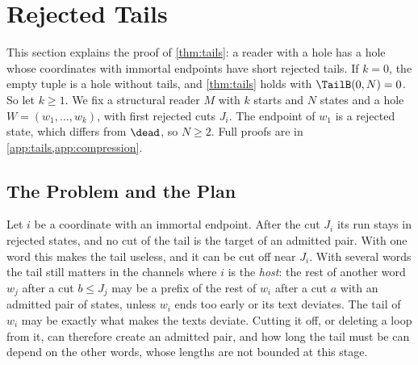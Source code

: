 \section{Rejected Tails}
\label{sec:tails}

This section explains the proof of \cref{thm:tails}: a reader with a hole
has a hole whose coordinates with immortal endpoints have short rejected
tails. If $k=0$, the empty tuple is a hole without tails, and
\cref{thm:tails} holds with $\TailB(0,N)=0$. So let $k\ge1$. We fix a
structural reader $M$ with $k$ starts and $N$ states and a hole
$W=(w_1,\dots,w_k)$, with first rejected cuts $J_i$. The endpoint of $w_1$
is a rejected state, which differs from $\dead$, so $N\ge2$. Full proofs are
in \cref{app:tails,app:compression}.

\subsection{The Problem and the Plan}\label{sec:tails-plan}

Let $i$ be a coordinate with an immortal endpoint. After the cut $J_i$ its
run stays in rejected states, and no cut of the tail is the target of an
admitted pair. With one word this makes the tail useless, and it can be cut
off near $J_i$. With several words the tail still matters in the channels
where $i$ is the \emph{host}: the rest of another word $w_j$ after a cut
$b\le J_j$ may be a prefix of the rest of $w_i$ after a cut $a$ with an
admitted pair of states, unless $w_i$ ends too early or its text deviates.
The tail of $w_i$ may be exactly what makes the texts deviate. Cutting it
off, or deleting a loop from it, can therefore create an admitted pair, and
how long the tail must be can depend on the other words, whose lengths are
not bounded at this stage.

